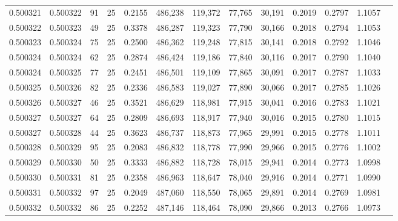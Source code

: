 \begin{tabular}{rrrrrrrrrrrrr}
0.500321 & 0.500322 &  91 &  25 &                                     0.2155 & 486,238 & 119,372 &  77,765 &  30,191 & 0.2019 & 0.2797 & 1.1057 \\
0.500322 & 0.500323 &  49 &  25 &                                     0.3378 & 486,287 & 119,323 &  77,790 &  30,166 & 0.2018 & 0.2794 & 1.1053 \\
0.500323 & 0.500324 &  75 &  25 &                                     0.2500 & 486,362 & 119,248 &  77,815 &  30,141 & 0.2018 & 0.2792 & 1.1046 \\
0.500324 & 0.500324 &  62 &  25 &                                     0.2874 & 486,424 & 119,186 &  77,840 &  30,116 & 0.2017 & 0.2790 & 1.1040 \\
0.500324 & 0.500325 &  77 &  25 &                                     0.2451 & 486,501 & 119,109 &  77,865 &  30,091 & 0.2017 & 0.2787 & 1.1033 \\
0.500325 & 0.500326 &  82 &  25 &                                     0.2336 & 486,583 & 119,027 &  77,890 &  30,066 & 0.2017 & 0.2785 & 1.1026 \\
0.500326 & 0.500327 &  46 &  25 &                                     0.3521 & 486,629 & 118,981 &  77,915 &  30,041 & 0.2016 & 0.2783 & 1.1021 \\
0.500327 & 0.500327 &  64 &  25 &                                     0.2809 & 486,693 & 118,917 &  77,940 &  30,016 & 0.2015 & 0.2780 & 1.1015 \\
0.500327 & 0.500328 &  44 &  25 &                                     0.3623 & 486,737 & 118,873 &  77,965 &  29,991 & 0.2015 & 0.2778 & 1.1011 \\
0.500328 & 0.500329 &  95 &  25 &                                     0.2083 & 486,832 & 118,778 &  77,990 &  29,966 & 0.2015 & 0.2776 & 1.1002 \\
0.500329 & 0.500330 &  50 &  25 &                                     0.3333 & 486,882 & 118,728 &  78,015 &  29,941 & 0.2014 & 0.2773 & 1.0998 \\
0.500330 & 0.500331 &  81 &  25 &                                     0.2358 & 486,963 & 118,647 &  78,040 &  29,916 & 0.2014 & 0.2771 & 1.0990 \\
0.500331 & 0.500332 &  97 &  25 &                                     0.2049 & 487,060 & 118,550 &  78,065 &  29,891 & 0.2014 & 0.2769 & 1.0981 \\
0.500332 & 0.500332 &  86 &  25 &                                     0.2252 & 487,146 & 118,464 &  78,090 &  29,866 & 0.2013 & 0.2766 & 1.0973 \\

\end{tabular}
